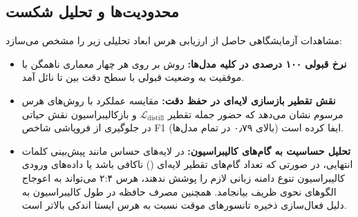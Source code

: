 \subsection{محدودیت‌ها و تحلیل شکست}
مشاهدات آزمایشگاهی حاصل از ارزیابی هرس  ابعاد تحلیلی زیر را مشخص می‌سازد:
\begin{itemize}
\item \textbf{نرخ قبولی ۱۰۰ درصدی در کلیه مدل‌ها:} روش  بر روی هر چهار معماری ناهمگن با موفقیت به وضعیت قبولی  با سطح دقت بین  تا  نائل آمد.
\item \textbf{نقش تقطیر بازسازی لایه‌ای در حفظ دقت:} مقایسه عملکرد با روش‌های هرس مرسوم نشان می‌دهد که حضور جمله تقطیر $\mathcal{L}_{\text{distill}}$ و بازکالیبراسیون  نقش حیاتی در جلوگیری از فروپاشی شاخص F1 (بالای ۰٫۷۹ در تمام مدل‌ها) ایفا کرده است.
\item \textbf{تحلیل حساسیت به گام‌های کالیبراسیون:} در لایه‌های حساس مانند پیش‌بینی کلمات انتهایی، در صورتی که تعداد گام‌های تقطیر لایه‌ای () ناکافی باشد یا داده‌های ورودی کالیبراسیون تنوع دامنه زبانی لازم را پوشش ندهند، هرس ۲:۴ می‌تواند به اعوجاج الگوهای نحوی ظریف بیانجامد. همچنین مصرف حافظه در طول کالیبراسیون به دلیل فعال‌سازی ذخیره تانسورهای موقت نسبت به هرس ایستا اندکی بالاتر است.
\end{itemize}
